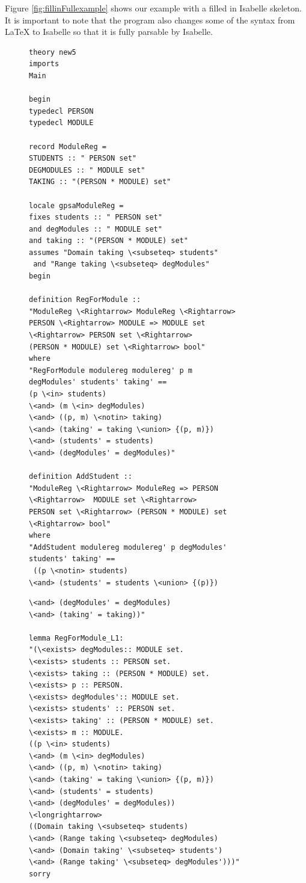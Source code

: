 Figure \ref{fig:fillinFullexample} shows our example with a filled in Isabelle skeleton. It is important to note that the program also changes some of the syntax from \LaTeX{} to Isabelle so that it is fully parsable by Isabelle.

\begin{figure}[H]
\centering
\begin{minipage}{0.45\textwidth}
\centering
\begin{scriptsize}
\begin{BVerbatim}
theory new5
imports 
Main 

begin 
typedecl PERSON 
typedecl MODULE

record ModuleReg = 
STUDENTS :: " PERSON set"
DEGMODULES :: " MODULE set"
TAKING :: "(PERSON * MODULE) set"

locale gpsaModuleReg = 
fixes students :: " PERSON set"
and degModules :: " MODULE set"
and taking :: "(PERSON * MODULE) set"
assumes "Domain taking \<subseteq> students" 
 and "Range taking \<subseteq> degModules"
begin

definition RegForModule :: 
"ModuleReg \<Rightarrow> ModuleReg \<Rightarrow>
PERSON \<Rightarrow> MODULE => MODULE set
\<Rightarrow> PERSON set \<Rightarrow> 
(PERSON * MODULE) set \<Rightarrow> bool"
where 
"RegForModule modulereg modulereg' p m
degModules' students' taking' ==
(p \<in> students) 
\<and> (m \<in> degModules) 
\<and> ((p, m) \<notin> taking)
\<and> (taking' = taking \<union> {(p, m)}) 
\<and> (students' = students) 
\<and> (degModules' = degModules)"

definition AddStudent :: 
"ModuleReg \<Rightarrow> ModuleReg => PERSON
\<Rightarrow>  MODULE set \<Rightarrow>
PERSON set \<Rightarrow> (PERSON * MODULE) set
\<Rightarrow> bool"
where 
"AddStudent modulereg modulereg' p degModules'
students' taking' ==
 ((p \<notin> students)
\<and> (students' = students \<union> {(p)}) 
\end{BVerbatim}
\end{scriptsize}
\end{minipage}\hfill
\begin{minipage}{0.45\textwidth}
\begin{scriptsize}
\begin{BVerbatim}
\<and> (degModules' = degModules) 
\<and> (taking' = taking))"

lemma RegForModule_L1:
"(\<exists> degModules:: MODULE set.
\<exists> students :: PERSON set.
\<exists> taking :: (PERSON * MODULE) set.
\<exists> p :: PERSON.
\<exists> degModules':: MODULE set.
\<exists> students' :: PERSON set.
\<exists> taking' :: (PERSON * MODULE) set.
\<exists> m :: MODULE.
((p \<in> students) 
\<and> (m \<in> degModules) 
\<and> ((p, m) \<notin> taking)
\<and> (taking' = taking \<union> {(p, m)}) 
\<and> (students' = students) 
\<and> (degModules' = degModules))
\<longrightarrow>
((Domain taking \<subseteq> students)
\<and> (Range taking \<subseteq> degModules)
\<and> (Domain taking' \<subseteq> students')
\<and> (Range taking' \<subseteq> degModules')))"
sorry


\end{BVerbatim}
\end{scriptsize}
\end{minipage}
\end{figure}
